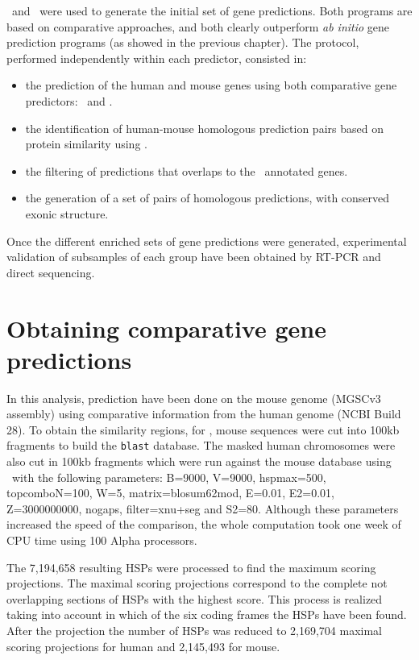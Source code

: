 \sgp\ and \twinscan\ were used to generate the initial set of gene
predictions. Both programs are based on comparative approaches, and
both clearly outperform \textit{ab initio} gene prediction programs
(as showed in the previous chapter). The protocol, performed
independently within each predictor, consisted in:

\begin{itemize}

\item the prediction of the human and mouse genes using both comparative 
gene predictors: \sgp\ and \twinscan.

\item the identification of human-mouse homologous prediction pairs based 
on protein similarity using \blp.

\item the filtering of  predictions that overlaps to the \ensembl\ 
annotated genes.

\item the generation of a set of pairs of homologous predictions, 
with conserved exonic structure.

\end{itemize}

Once the different enriched sets of gene predictions were generated,
experimental validation of subsamples of each group have been obtained
by RT-PCR and direct sequencing.

\section{Obtaining comparative gene predictions}

In this analysis, prediction have been done on the mouse genome
(MGSCv3 assembly) using comparative information from the human genome
(NCBI Build 28). To obtain the similarity regions, for \sgp, mouse
sequences were cut into 100kb fragments to build the \texttt{blast}
database. The masked human chromosomes were also cut in 100kb
fragments which were run against the mouse database using \tbx\ with
the following parameters: B=9000, V=9000, hspmax=500, topcomboN=100,
W=5, matrix=blosum62mod, E=0.01, E2=0.01, Z=3000000000, nogaps,
filter=xnu+seg and S2=80. Although these parameters increased the
speed of the comparison, the whole computation took one week of CPU
time using 100 Alpha processors.

The 7,194,658 resulting HSPs were processed to find the maximum
scoring projections. The maximal scoring projections correspond to the
complete not overlapping sections of HSPs with the highest score. This
process is realized taking into account in which of the six coding
frames the HSPs have been found. After the projection the number of
HSPs was reduced to 2,169,704 maximal scoring projections for human
and 2,145,493 for mouse.

